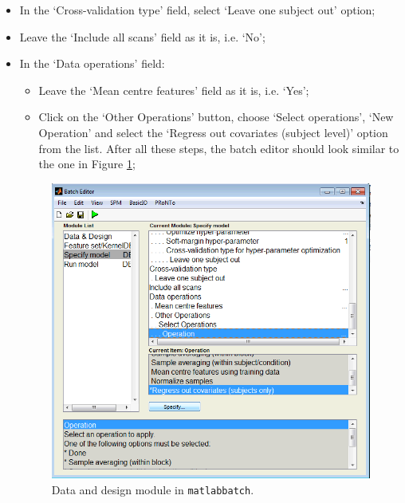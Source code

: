 \begin{itemize}
	\begin{itemize}
	\item Select the `SVM Classification' option;	
	
	\item Leave the `Optimize hyper-parameter' field as it is, i.e. `No';
	
	\item Leave the `Soft-margin hyper-parameter' field as it is, i.e. `1';
	
	\item Leave the `Cross validation type for hyper-parameter optimization' field as it is, i.e. `Leave one subject out';  
	
	
	\end{itemize}
	
	\item In the `Cross-validation type' field, select `Leave one subject out' option;
	
	\item Leave the `Include all scans' field as it is, i.e. `No';

	\item In the `Data operations' field:
	
		\begin{itemize}
		\item  Leave the `Mean centre features' field as it is, i.e. `Yes'; 
				
		\item  Click on the `Other Operations' button, choose `Select operations', `New Operation' and select the `Regress out covariates (subject level)' option from the list. After all these steps, the batch editor should look similar to the one in Figure \ref{fig:model_batch};
		\end{itemize}
		
	\begin{figure}[h!]
	\centering
		\includegraphics[scale=0.6]{images/Tutorial/confounds/model_batch.png}
	\caption{Data and design module in {\tt matlabbatch}. }
	\label{fig:model_batch}
	\end{figure}
	

\end{itemize}
